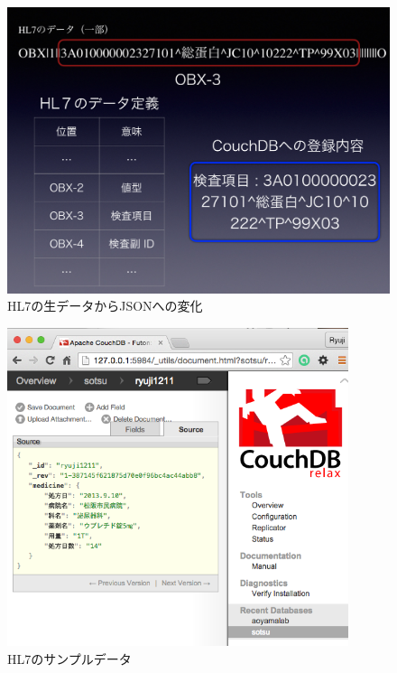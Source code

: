 			\begin{figure}[htbp]
				\begin{center}
					\includegraphics[width=15cm, bb=0 0 1435 1073]{./gazou/hl7-data-trans2.png}
				\end{center}
				\caption{HL7の生データからJSONへの変化}
				\label{hl7-data-trans}
			\end{figure}

			\begin{figure}[htbp]
				\begin{center}
					\includegraphics[width=10cm, bb=0 0 576 573]{./gazou/hl7-data.png}
				\end{center}
				\caption{HL7のサンプルデータ}
				\label{hl7-data}
			\end{figure}



